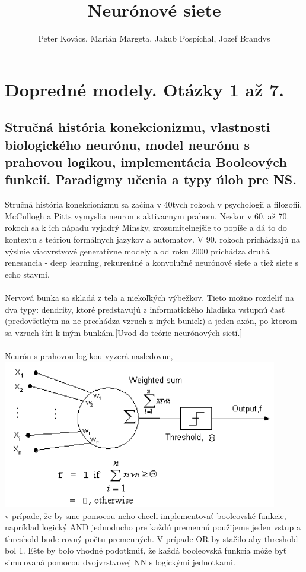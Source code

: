 \documentclass{article}
\title{ Neurónové siete}
\author{Peter Kovács, Marián Margeta, Jakub Pospíchal, Jozef Brandys}
\date{ }
\numberwithin{equation}{section} %
\begin{document}
\maketitle
\tableofcontents
\newpage
\section{Dopredné modely. Otázky 1 až 7. }
\subsection{Stručná história konekcionizmu, vlastnosti biologického neurónu, model neurónu s prahovou logikou,
implementácia Booleových funkcií. Paradigmy učenia a typy úloh pre NS.}
Stručná história konekcionizmu sa začína v 40tych rokoch v psychologii a filozofii. McCullogh a Pitts vymyslia neuron s aktivacnym prahom. Neskor v 60. až 70. rokoch sa k ich nápadu vyjadrý Minsky, zrozumitelnejšie to popíše a dá to do kontextu s teóriou formálnych jazykov a automatov. V 90. rokoch prichádzajú na výslnie viacvrstvové generatívne modely a od roku 2000 prichádza druhá renesancia - deep learning, rekurentné a konvolučné neurónové sieťe a tiež siete s echo stavmi.
\\\\
Nervová bunka sa skladá z tela a niekoľkých výbežkov. Tieto možno rozdeliť na dva typy: dendrity, ktoré predstavujú z informatického hľadiska vstupnú časť (predovšetkým na ne prechádza vzruch z iných buniek) a jeden axón, po ktorom sa vzruch šíri k iným bunkám.[Uvod do teórie neurónových sietí.]
\\\\
Neurón s prahovou logikou vyzerá nasledovne, \\
\includegraphics[width=12cm]{imgs/threshold_neuron}\\
v prípade, že by sme pomocou neho chceli implementovať booleovské funkcie, napríklad logický AND jednoducho pre každú premennú použijeme jeden vstup a threshold bude rovný počtu premenných. V prípade OR by stačilo aby threshold bol 1. Ešte by bolo vhodné podotknúť, že každá booleovská funkcia môže byť simulovaná pomocou dvojvrstvovej NN s logickými jednotkami.
\end{document}
